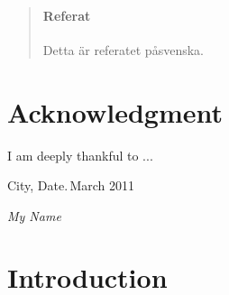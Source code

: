 \documentclass[11pt,a4paper,twoside,openright, abstractoff,titlepage,final,parskip=half*,BCOR10mm]{scrreprt}%
\begin{document}
\renewcommand\abstractname{Referat}

\begin{abstract}

\subsubsection*{\centering\abstractname}


Detta \"ar referatet p\aa svenska.

\end{abstract}



\thispagestyle{empty}
\cleardoublepage


\clearpage
\thispagestyle{empty}
\renewcommand*{\chapterpagestyle}{empty}
\chapter*{Acknowledgment}

I am deeply thankful to ...


  
\vspace{1.0cm}

\noindent
City, Date.\,March 2011 %

\textit{My Name}
\clearpage
\renewcommand*{\chapterpagestyle}{plain}



\thispagestyle{empty}
\cleardoublepage



%
\tableofcontents
\newpage
\listoffigures
\listoftables







\cleardoublepage


\chapter{Introduction} 
\label{chap_Intro}
\end{document}
